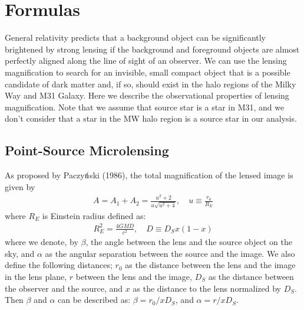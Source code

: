\documentclass[iop, apj]{emulateapj}
\newcommand{\?}{\stackrel{?}{=}}
\begin{document}

\section{Formulas}%
\label{sec:pointlens}
General relativity predicts that a background object can be significantly brightened by strong lensing if the background and foreground objects are almost perfectly aligned along the line of sight of an observer. We can use the lensing magnification to search for an invisible, small compact object that is a possible candidate of dark matter and, if so, should exist in the halo regions of the Milky Way and M31 Galaxy. 
Here we describe the observational properties of lensing magnification. 
Note that we assume that source star is a star in M31, and we don't consider that 
a star in the MW halo region is a source star in our analysis. 

\subsection{Point-Source Microlensing}
As proposed by Paczy${\rm \acute{n}}$ski (1986), 
the total magnification of the lensed image is given by 
% 
\begin{eqnarray}
A=A_{1}+A_{2}=\frac{u^2+2}{u\sqrt{u^2+4}}, \quad u\equiv\frac{r_0}{R_E}
\label{eq:cano}
\end{eqnarray}
%
%
where $R_E$ is Einstein radius defined as:  %
\begin{eqnarray}
R^2_E=\frac{4GMD}{c^2},\quad D\equiv D_S x(1-x)
\end{eqnarray}
%
where we denote, 
by $\beta$, the angle between the lens and the source object on the sky, and 
$\alpha$ as the angular separation between the source and the image.
We also define the following distances; 
$r_0$ as the distance between the lens and the image in the lens plane,
$r$ between the lens and the image, 
$D_S$ as the distance between the observer and the source, and 
$x$ as the distance to the lens normalized by $D_S$. 
Then $\beta$ and $\alpha$ can be described as:
$\beta={r_0}/{x{D_S}}$, and $\alpha={r}/{x{D_S}}$. 
\end{document}
